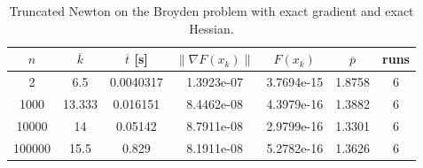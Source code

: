 \begin{table}
\caption{Truncated Newton on the Broyden problem with exact gradient and exact Hessian.}
\label{tab:tn_broyden_exact}
\begin{tabular}{ccccccc}
\toprule
$n$ & $\overline{k}$ & $\overline{t}$ [s] & $\|\nabla F(x_k)\|$ & $F(x_k)$ & $\overline{p}$ & runs \\
\midrule
2 & 6.5 & 0.0040317 & 1.3923e-07 & 3.7694e-15 & 1.8758 & 6 \\
1000 & 13.333 & 0.016151 & 8.4462e-08 & 4.3979e-16 & 1.3882 & 6 \\
10000 & 14 & 0.05142 & 8.7911e-08 & 2.9799e-16 & 1.3301 & 6 \\
100000 & 15.5 & 0.829 & 8.1911e-08 & 5.2782e-16 & 1.3626 & 6 \\
\bottomrule
\end{tabular}
\end{table}
